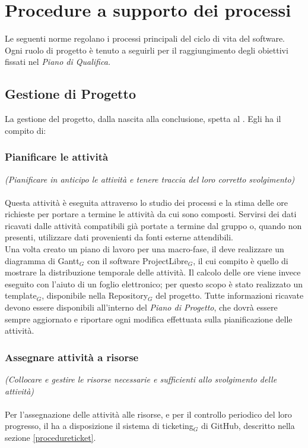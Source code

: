 \section{Procedure a supporto dei processi} \label{procedure}
Le seguenti norme regolano i processi principali del ciclo di vita del software. Ogni ruolo di progetto è tenuto a seguirli per il raggiungimento degli obiettivi fissati nel \textit{Piano di Qualifica.}

\subsection{Gestione di Progetto}
La gestione del progetto, dalla nascita alla conclusione, spetta al \ruoloResponsabile . Egli ha il compito di:
\subsubsection{Pianificare le attività}
\textit{(Pianificare in anticipo le attività e tenere traccia del loro corretto svolgimento)} \\ \\
Questa attività è eseguita attraverso lo studio dei processi e la stima delle ore richieste per portare a termine le attività da cui sono composti. Servirsi dei dati ricavati dalle attività compatibili già portate a termine dal gruppo o, quando non presenti, utilizzare dati provenienti da fonti esterne attendibili. \\
Una volta creato un piano di lavoro per una macro-fase, il \ruoloResponsabile{}  deve realizzare un diagramma di Gantt$_G$ con il software ProjectLibre$_G$, il cui compito è quello di mostrare la distribuzione temporale delle attività. Il calcolo delle ore viene invece eseguito con l'aiuto di un foglio elettronico; per questo scopo è stato realizzato un template$_G$, disponibile nella Repository$_G$ del progetto. Tutte informazioni ricavate devono essere disponibili all'interno del \textit{Piano di Progetto}, che dovrà essere sempre aggiornato e riportare ogni modifica effettuata sulla pianificazione delle attività.

\subsubsection{Assegnare attività a risorse}
\textit{(Collocare e gestire le risorse necessarie e sufficienti allo svolgimento delle attività)}\\ \\
Per l'assegnazione delle attività alle risorse, e per il controllo periodico del loro progresso, il \ruoloResponsabile{} ha a disposizione il sistema di ticketing$_G$ di GitHub, descritto nella sezione \ref{procedureticket}.
